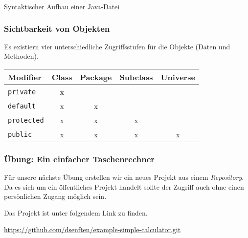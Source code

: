 \begin{listing}[h]
    \begin{center}
        \begin{minipage}{0.8\textwidth}
            \inputminted[firstline=41,lastline=46,frame=single,linenos]{antlr}{Java.g4}
        \end{minipage}
    \end{center}
    \caption{Syntaktischer Aufbau einer Java-Datei}
    \label{antlr:java-file}
\end{listing}



\begin{frame}[fragile]
    \frametitle<presentation>{Sichtbarkeit von Objekten}

    Es existiern vier unterschiedliche Zugriffsstufen für die
    Objekte (Daten und Methoden).

    \begin{table}[ht]
        \begin{center}
            \begin{tabular}{p{3cm}|c|c|c|c}
                Modifier & Class & Package & Subclass & Universe \\ \hline
                \texttt{private}   & x & & &          \\
                \texttt{default}             & x & x & &          \\
                \texttt{protected} & x & x & x &          \\
                \texttt{public}    & x & x & x & x
            \end{tabular}
        \end{center}
        \label{tab:access-level}
    \end{table}

\end{frame}


\begin{frame}[fragile]
    \frametitle<presentation>{Übung: Ein einfacher Taschenrechner}
    Für unsere nächste Übung erstellen wir ein neues Projekt aus einem
    \emph{Repository}. Da es sich um ein öffentliches Projekt handelt sollte
    der Zugriff auch ohne einen persönlichen Zugang möglich sein.

    Das Projekt ist unter folgendem Link zu finden.

    \href{https://github.com/dsenften/example-simple-calculator.git}
    {https://github.com/dsenften/example-simple-calculator.git}
\end{frame}


